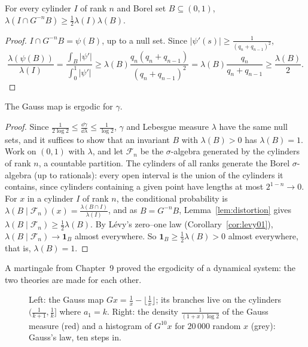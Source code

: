 \begin{lemma}\label{lem:distortion}
For every cylinder $I$ of rank $n$ and Borel set $B\subseteq(0,1)$, $\lambda(I\cap G^{-n}B)\ge\frac12\lambda(I)\lambda(B)$.
\end{lemma}
\begin{proof}
$I\cap G^{-n}B=\psi(B)$, up to a null set. Since $|\psi'(s)|\ge\frac1{(q_n+q_{n-1})^2}$,
\[
\frac{\lambda(\psi(B))}{\lambda(I)}=\frac{\int_B|\psi'|}{\int_0^1|\psi'|}\ge\lambda(B)\frac{q_n(q_n+q_{n-1})}{(q_n+q_{n-1})^2}=\lambda(B)\frac{q_n}{q_n+q_{n-1}}\ge\frac{\lambda(B)}2.
\]
\end{proof}

\begin{theorem}\label{thm:gaussergodic}
The Gauss map is ergodic for $\gamma$.
\end{theorem}
\begin{proof}
Since $\frac1{2\log2}\le\frac{\dd\gamma}{\dd\lambda}\le\frac1{\log2}$, $\gamma$ and Lebesgue measure $\lambda$ have the same null sets, and it suffices to show that an invariant $B$ with $\lambda(B)>0$ has $\lambda(B)=1$. Work on $(0,1)$ with $\lambda$, and let $\mathcal F_n$ be the
$\sigma$-algebra generated by the cylinders of rank $n$, a countable partition. The cylinders of all ranks generate the Borel $\sigma$-algebra (up to rationals): every open interval is the union of the cylinders it
contains, since cylinders containing a given point have lengths at most $2^{1-n}\to0$. For $x$ in a cylinder $I$ of rank $n$, the conditional probability is $\lambda(B\mid\mathcal F_n)(x)=\frac{\lambda(B\cap I)}{\lambda(I)}$, and as $B=G^{-n}B$,
Lemma~\ref{lem:distortion} gives $\lambda(B\mid\mathcal F_n)\ge\frac12\lambda(B)$. By L\'evy's zero--one law (Corollary~\ref{cor:levy01}), $\lambda(B\mid\mathcal F_n)\to\mathbf 1_B$ almost everywhere. So $\mathbf 1_B\ge\frac12\lambda(B)>0$ almost everywhere,
that is, $\lambda(B)=1$.
\end{proof}

A martingale from Chapter~9 proved the ergodicity of a dynamical system: the two theories are made for each other.

\begin{figure}[ht]
\centering{}
\caption{Left: the Gauss map $Gx=\frac1x-\lfloor\frac1x\rfloor$; its branches live on the cylinders $(\frac1{k+1},\frac1k]$ where $a_1=k$. Right: the density $\frac1{(1+x)\log2}$ of the Gauss measure (red) and a histogram of
$G^{10}x$ for $20\,000$ random $x$ (grey): Gauss's law, ten steps in.}
\label{fig:gaussmap}
\end{figure}

